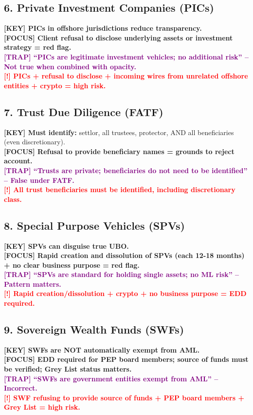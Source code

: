 \documentclass[10pt,a4paper]{article}
\newcommand{\redflag}[1]{\textcolor{red}{\textbf{[!] #1}}}
\newcommand{\examfocus}[1]{\textcolor{orange!80!black}{\textbf{[FOCUS] #1}}}
\newcommand{\trap}[1]{\textcolor{purple}{\textbf{[TRAP] #1}}}
\newcommand{\keyterm}[1]{\textcolor{red!80!black}{\textbf{[KEY] #1}}}
\begin{document}
\subsection*{6. Private Investment Companies (PICs)}
\keyterm{PICs in offshore jurisdictions reduce transparency.} \\
\examfocus{Client refusal to disclose underlying assets or investment strategy = red flag.} \\
\trap{“PICs are legitimate investment vehicles; no additional risk” – Not true when combined with opacity.} \\
\redflag{PICs + refusal to disclose + incoming wires from unrelated offshore entities + crypto = high risk.}

\subsection*{7. Trust Due Diligence (FATF)}
\keyterm{Must identify:} settlor, all trustees, protector, AND all beneficiaries (even discretionary). \\
\examfocus{Refusal to provide beneficiary names = grounds to reject account.} \\
\trap{“Trusts are private; beneficiaries do not need to be identified” – False under FATF.} \\
\redflag{All trust beneficiaries must be identified, including discretionary class.}

\subsection*{8. Special Purpose Vehicles (SPVs)}
\keyterm{SPVs can disguise true UBO.} \\
\examfocus{Rapid creation and dissolution of SPVs (each 12-18 months) + no clear business purpose = red flag.} \\
\trap{“SPVs are standard for holding single assets; no ML risk” – Pattern matters.} \\
\redflag{Rapid creation/dissolution + crypto + no business purpose = EDD required.}

\subsection*{9. Sovereign Wealth Funds (SWFs)}
\keyterm{SWFs are NOT automatically exempt from AML.} \\
\examfocus{EDD required for PEP board members; source of funds must be verified; Grey List status matters.} \\
\trap{“SWFs are government entities exempt from AML” – Incorrect.} \\
\redflag{SWF refusing to provide source of funds + PEP board members + Grey List = high risk.}
\end{document}
